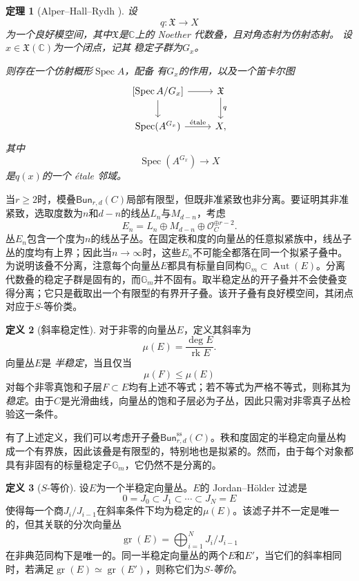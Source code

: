 \documentclass{amsart}
\newtheorem{thm}{定理}[section]
\theoremstyle{definition}
\newtheorem{defn}[thm]{定义}
\theoremstyle{remark}
\theoremstyle{plain}
\theoremstyle{definition}
\theoremstyle{remark}
\newcommand{\G}{\mathbb{G}}
\newcommand{\C}{\mathbb{C}}
\newcommand{\mc}[1]{\mathcal{#1}}
\newcommand{\mf}[1]{\mathfrak{#1}}
\newcommand{\mr}[1]{\mathrm{#1}}
\newcommand{\on}[1]{\operatorname{#1}}
\newcommand{\ms}[1]{\mathsf{#1}}
\newcommand{\1}{\mathbf{1}}
\newcommand{\2}{\mathbf{2}}
\newcommand{\3}{\mathbf{3}}
\begin{document}
\begin{thm}[Alper--Hall--Rydh {\cite{AHR2020}}]
设
    \[
        q\colon \mf{X}\longrightarrow X
    \]
为一个良好模空间，其中\(\mf{X}\)是\(\C\)上的 Noether 代数叠，且对角态射为仿射态射。
设\(x\in\mf{X}(\C)\)为一个闭点，记其
稳定子群为\(G_x\)。

则存在一个仿射概形\(\on{Spec}A\)，配备
有\(G_x\)的作用，以及一个笛卡尔图
    \[
        \begin{tikzcd}
            {[\on{Spec}A/G_x]}
                \arrow[r]
                \arrow[d]
            & \mf{X}
                \arrow[d, "q"]
            \\
            \on{Spec}(A^{G_x})
                \arrow[r, "\mathrm{\acute{e}tale}"]
            & X,
        \end{tikzcd}
    \]
其中
    \[
        \on{Spec}(A^{G_x})\longrightarrow X
    \]
是\(q(x)\)的一个 \'etale 邻域。
\end{thm}

当\(r\geq 2\)时，模叠\(\ms{Bun}_{r,d}(C)\)局部有限型，但既非准紧致也非分离。要证明其非准紧致，选取度数为\(n\)和\(d-n\)的线丛\(L_n\)与\(M_{d-n}\)，考虑
\[
    E_n=L_n\oplus M_{d-n}\oplus\mc{O}_C^{\oplus r-2}.
\]
丛\(E_n\)包含一个度为\(n\)的线丛子丛。在固定秩和度的向量丛的任意拟紧族中，线丛子丛的度均有上界；因此当\(n\to\infty\)时，这些\(E_n\)不可能全都落在同一个拟紧子叠中。为说明该叠不分离，注意每个向量丛\(E\)都具有标量自同构\(\G_m\subset\on{Aut}(E)\)。分离代数叠的稳定子群是固有的，而\(\G_m\)并不固有。取半稳定丛的开子叠并不会使叠变得分离；它只是截取出一个有限型的有界开子叠。该开子叠有良好模空间，其闭点对应于\(S\)-等价类。

\begin{defn}[斜率稳定性]
    对于非零的向量丛\(E\)，定义其斜率为
    \[ \mu(E)=\frac{\deg E}{\on{rk}E}. \]
向量丛\(E\)是 \textit{半稳定}，当且仅当
    \[ \mu(F)\leq\mu(E) \]
    对每个非零真饱和子层\(F\subset E\)均有上述不等式；若不等式为严格不等式，则称其为\textit{稳定}。由于\(C\)是光滑曲线，向量丛的饱和子层必为子丛，因此只需对非零真子丛检验这一条件。
\end{defn}

有了上述定义，我们可以考虑开子叠\(\ms{Bun}_{r,d}^{\mr{ss}}(C)\)。秩和度固定的半稳定向量丛构成一个有界族，因此该叠是有限型的，特别地也是拟紧的。然而，由于每个对象都具有非固有的标量稳定子\(\G_m\)，它仍然不是分离的。

\begin{defn}[\(S\)-等价]
设\(E\)为一个半稳定向量丛。\(E\)的 Jordan--H\"older 过滤是
    \[ 0=J_0\subset J_1\subset\cdots\subset J_N=E \]
    使得每一个商\(J_i/J_{i-1}\)在斜率条件下均为稳定的\(\mu(E)\)。该滤子并不一定是唯一的，但其关联的分次向量丛
    \[
        \on{gr}(E)=\bigoplus_{i=1}^N J_i/J_{i-1}
    \]
    在非典范同构下是唯一的。同一半稳定向量丛的两个\(E\)和\(E'\)，当它们的斜率相同时，若满足\(\on{gr}(E)\simeq\on{gr}(E')\)，则称它们为\textit{\(S\)-等价}。
\end{defn}
\end{document}
